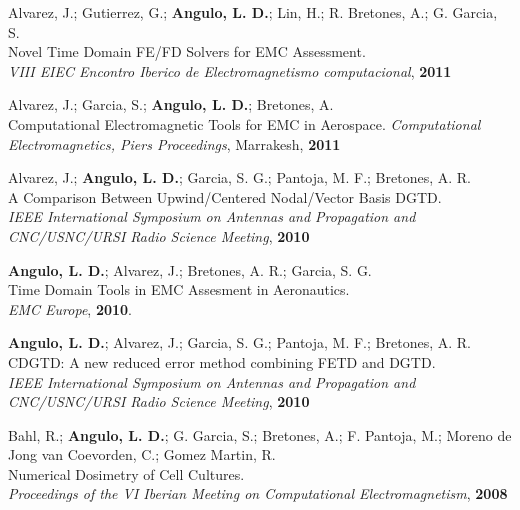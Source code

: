 \documentclass[margin,line]{res}
\begin{document}
\begin{minipage}{\textwidth}
Alvarez, J.; Gutierrez, G.;  {\bf Angulo, L. D.}; Lin, H.; R. Bretones, A.; G. Garcia, S.\\
Novel Time Domain FE/FD Solvers for EMC Assessment.\\
{\it VIII EIEC Encontro Iberico de Electromagnetismo computacional}, {\bf 2011}
\end{minipage}

\begin{minipage}{\textwidth}
Alvarez, J.; Garcia, S.;  {\bf Angulo, L. D.}; Bretones, A.\\
Computational Electromagnetic Tools for EMC in Aerospace. 
{\it Computational Electromagnetics, Piers Proceedings}, Marrakesh, {\bf 2011}
\end{minipage}

\begin{minipage}{\textwidth}
Alvarez, J.;  {\bf Angulo, L. D.}; Garcia, S. G.; Pantoja, M. F.; Bretones, A. R.\\
A Comparison Between Upwind/Centered Nodal/Vector Basis DGTD.\\
{\it IEEE International Symposium on Antennas and Propagation and CNC/USNC/URSI Radio Science Meeting}, {\bf 2010}
\end{minipage}

\begin{minipage}{\textwidth}
{\bf Angulo, L. D.}; Alvarez, J.; Bretones, A. R.; Garcia, S. G.\\
Time Domain Tools in EMC Assesment in Aeronautics.\\
{\it EMC Europe}, {\bf 2010}.
\end{minipage}

\begin{minipage}{\textwidth}
{\bf Angulo, L. D.}; Alvarez, J.; Garcia, S. G.; Pantoja, M. F.; Bretones, A. R.\\
CDGTD: A new reduced error method combining FETD and DGTD.\\
{\it IEEE International Symposium on Antennas and Propagation and CNC/USNC/URSI Radio Science Meeting}, {\bf 2010}
\end{minipage}

\begin{minipage}{\textwidth}
Bahl, R.;  {\bf Angulo, L. D.}; G. Garcia, S.; Bretones, A.; F. Pantoja, M.; Moreno de Jong van Coevorden, C.; Gomez Martin, R.\\
Numerical Dosimetry of Cell Cultures.\\
{\it Proceedings of the VI Iberian Meeting on Computational Electromagnetism}, {\bf 2008}
\end{minipage}
\end{document}
